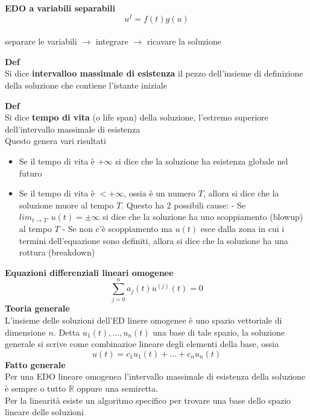 \documentclass[12pt, a4paper]{article}
\begin{document}
\textbf{EDO a variabili separabili}\[u^{I}=f(t)g(u)\]\\separare le variabili $\to$ integrare $\to$ ricavare la
soluzione

\textbf{Def}\\Si dice \textbf{intervalloo massimale di esistenza} il pezzo dell'insieme di definizione della
soluzione che contiene l'istante iniziale

\textbf{Def}\\Si dice \textbf{tempo di vita} (o life span) della soluzione, l'estremo superiore dell'intervallo
massimale di esistenza\\Questo genera vari risultati
\begin{itemize}
    \item Se il tempo di vita è $+\infty$ si dice che la soluzione ha esistenza globale nel futuro
    \item Se il tempo di vita è $<+\infty$, ossia è un numero $T$, allora si dice che la soluzione muore al tempo
          $T$. Questo ha 2 possibili cause:
          \subitem - Se $lim_{t\to T^{-}}u(t)=\pm\infty$ si dice che la soluzione ha uno scoppiamento (blowup) al tempo $T$
          \subitem - Se non c'è scoppiamento ma $u(t)$ esce dalla zona in cui i termini dell'equazione sono definiti,
          allora si dice che la soluzione ha una rottura (breakdown)
\end{itemize}

\textbf{Equazioni differenziali lineari omogenee}\[\sum_{j=0}^{n}a_{j}(t)u^{(j)}(t)=0\]
\textbf{Teoria generale}\\L'insieme delle soluzioni dell'ED linere omogenee è uno spazio vettoriale di dimensione
$n$. Detta $u_{1}(t),...,u_{n}(t)$ una base di tale spazio, la soluzione generale si scrive come combinazioe
lineare degli elementi della base, ossia \[u(t)=c_{1}u_{1}(t)+...+c_{n}u_{n}(t)\]
\textbf{Fatto generale}\\Per una EDO lineare omogenea l'intervallo massimale di esistenza della soluzione è sempre
o tutto $\mathbb{R}$ oppure una semiretta.\\Per la linearità esiste un algoritmo specifico per trovare una base dello
spazio lineare delle soluzioni
\end{document}
